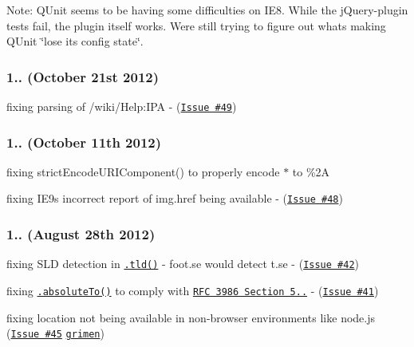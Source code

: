Note\+: Q\+Unit seems to be having some difficulties on I\+E8. While the j\+Query-\/plugin tests fail, the plugin itself works. We\textquotesingle{}re still trying to figure out what\textquotesingle{}s making Q\+Unit \char`\"{}lose its config state\char`\"{}.

\subsubsection*{1.. (October 21st 2012)}


\begin{DoxyItemize}
\item fixing parsing of {\ttfamily /wiki/\+Help\+:I\+PA} -\/ (\href{https://github.com/medialize/URI.js/issues/49}{\tt Issue \#49})
\end{DoxyItemize}

\subsubsection*{1.. (October 11th 2012)}


\begin{DoxyItemize}
\item fixing {\ttfamily strict\+Encode\+U\+R\+I\+Component()} to properly encode {\ttfamily $\ast$} to {\ttfamily \%2A}
\item fixing I\+E9\textquotesingle{}s incorrect report of {\ttfamily img.\+href} being available -\/ (\href{https://github.com/medialize/URI.js/issues/48}{\tt Issue \#48})
\end{DoxyItemize}

\subsubsection*{1.. (August 28th 2012)}


\begin{DoxyItemize}
\item fixing S\+LD detection in \href{http://medialize.github.io/URI.js/docs.html#accessors-tld}{\tt {\ttfamily .tld()}} -\/ {\ttfamily foot.\+se} would detect {\ttfamily t.\+se} -\/ (\href{https://github.com/medialize/URI.js/issues/42}{\tt Issue \#42})
\item fixing \href{http://medialize.github.io/URI.js/docs.html#absoluteto}{\tt {\ttfamily .absolute\+To()}} to comply with \href{http://tools.ietf.org/html/rfc3986#section-5.2.2}{\tt R\+FC 3986 Section 5..} -\/ (\href{https://github.com/medialize/URI.js/issues/41}{\tt Issue \#41})
\item fixing {\ttfamily location} not being available in non-\/browser environments like node.\+js (\href{https://github.com/medialize/URI.js/issues/45}{\tt Issue \#45} \href{https://github.com/grimen}{\tt grimen})
\end{DoxyItemize}

